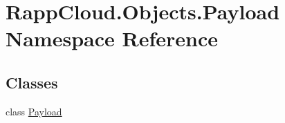 \hypertarget{namespaceRappCloud_1_1Objects_1_1Payload}{\section{Rapp\-Cloud.\-Objects.\-Payload Namespace Reference}
\label{namespaceRappCloud_1_1Objects_1_1Payload}
}
\subsection*{Classes}
\begin{DoxyCompactItemize}
\item 
class \hyperlink{classRappCloud_1_1Objects_1_1Payload_1_1Payload}{Payload}
\end{DoxyCompactItemize}
